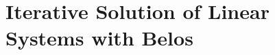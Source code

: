 % 
% 
% 
%   
%   
% 
% 

\chapter{Iterative Solution of Linear Systems with Belos}
\label{chap:belos}


